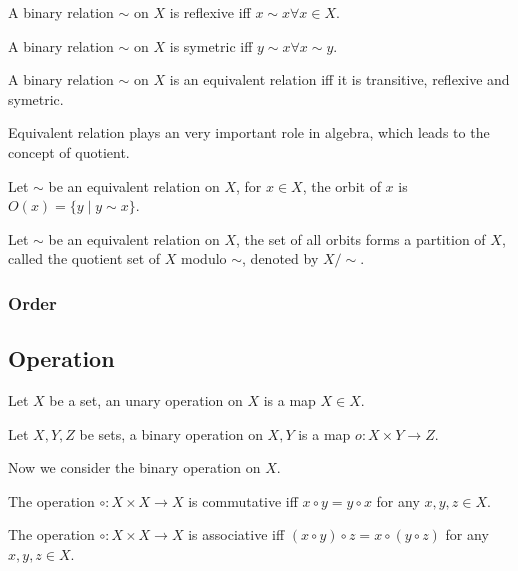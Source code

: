 \begin{defi}[reflexive]
A binary relation $\sim$ on $X$ is reflexive iff $x \sim x \forall x \in X$.
\end{defi}

\begin{defi}[symetric]
A binary relation $\sim$ on $X$ is symetric iff $y \sim x \forall x \sim y$.
\end{defi}

\begin{defi}
A binary relation $\sim$ on $X$ is an equivalent relation iff it is transitive, 
reflexive and symetric.
\end{defi}

Equivalent relation plays an very important role in algebra, which leads to the
concept of quotient.

\begin{defi}[orbit]
Let $\sim$ be an equivalent relation on $X$, for $x \in X$, the orbit of $x$ is
$O(x) = \{y \mid y \sim x\}$.
\end{defi}

\begin{defi}[quotient]
Let $\sim$ be an equivalent relation on $X$, the set of all orbits forms a partition
of $X$, called the quotient set of $X$ modulo $\sim$, denoted by $X / \sim$.
\end{defi}

\subsubsection{Order}

\subsection{Operation}
\begin{defi}
Let $X$ be a set, an unary operation on $X$ is a map $X \in X$.
\end{defi}

\begin{defi}
Let $X, Y, Z$ be sets, a binary operation on $X, Y$ is a map $o : X \times Y \to Z$.
\end{defi}

Now we consider the binary operation on $X$.

\begin{defi}
The operation $\circ : X \times X \to X$ is commutative iff $x \circ y = y \circ x$
for any $x, y, z \in X$.
\end{defi}

\begin{defi}
The operation $\circ : X \times X \to X$ is associative iff $(x \circ y) \circ z = x \circ (y \circ z)$
for any $x, y, z \in X$.
\end{defi}
